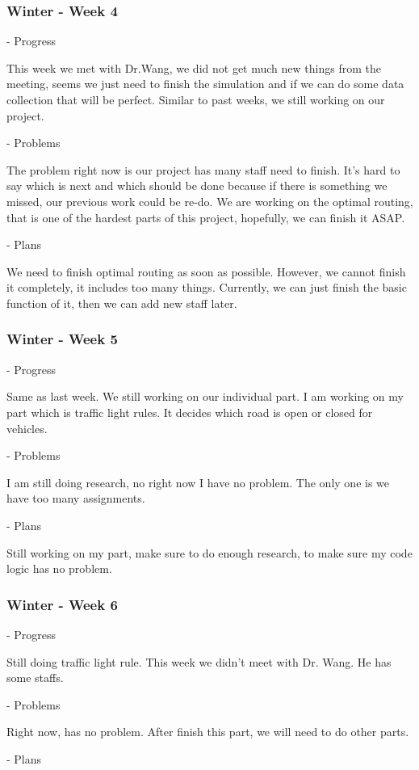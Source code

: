 \documentclass[onecolumn, draftclsnofoot,10pt, compsoc]{IEEEtran}
\begin{document}
\subsubsection{Winter - Week 4}
- Progress

This week we met with Dr.Wang, we did not get much new things from the meeting, seems we just need to finish the simulation and if we can do some data collection that will be perfect.
Similar to past weeks, we still working on our project.

- Problems

The problem right now is our project has many staff need to finish.
It's hard to say which is next and which should be done because if there is something we missed, our previous work could be re-do.
We are working on the optimal routing, that is one of the hardest parts of this project, hopefully, we can finish it ASAP.

- Plans

We need to finish optimal routing as soon as possible.
However, we cannot finish it completely, it includes too many things.
Currently, we can just finish the basic function of it, then we can add new staff later.
\subsubsection{Winter - Week 5}
- Progress

Same as last week.
We still working on our individual part.
I am working on my part which is traffic light rules.
It decides which road is open or closed for vehicles.

- Problems

I am still doing research, no right now I have no problem.
The only one is we have too many assignments.

- Plans

Still working on my part, make sure to do enough research, to make sure my code logic has no problem.
\subsubsection{Winter - Week 6}
- Progress

Still doing traffic light rule.
This week we didn't meet with Dr. Wang.
He has some staffs.

- Problems

Right now, has no problem.
After finish this part, we will need to do other parts.

- Plans
\end{document}
